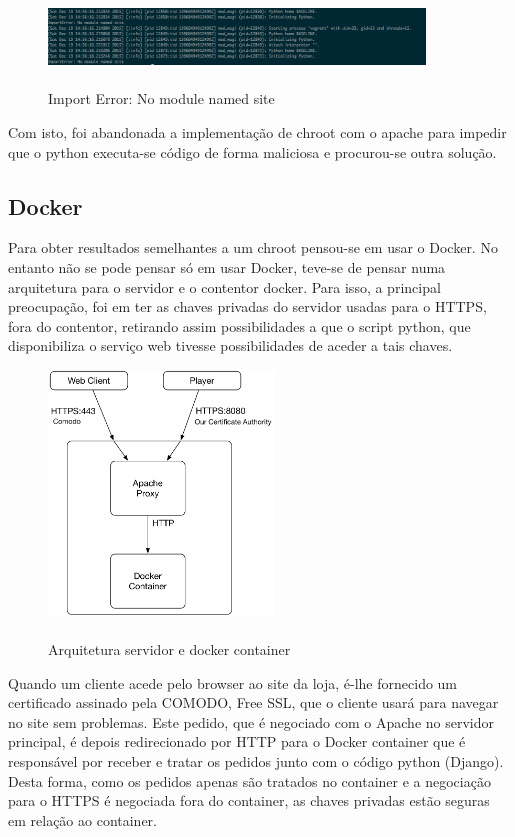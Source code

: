 \documentclass[pdftex,12pt,a4paper]{report}
\begin{document}
\begin{figure}[!htb]
\center
 \includegraphics[width=100mm,scale=1]{import_error.png}
 \caption{\\Import Error: No module named site}
 \label{fig:import_Error}
\end{figure}

Com isto, foi abandonada a implementação de chroot com o apache para impedir que o python executa-se código de forma maliciosa e procurou-se outra solução.

\newpage
\subsection{Docker}
Para obter resultados semelhantes a um chroot pensou-se em usar o Docker. No entanto não se pode pensar só em usar Docker, teve-se de pensar numa arquitetura para o servidor e o contentor docker. Para isso, a principal preocupação, foi em ter as chaves privadas do servidor usadas para o HTTPS, fora do contentor, retirando assim possibilidades a que o script python, que disponibiliza o serviço web tivesse possibilidades de aceder a tais chaves.

\begin{figure}[!htb]
\center
 \includegraphics[width=60mm,scale=1]{docker.pdf}
 \caption{\\Arquitetura servidor e docker container}
 \label{fig:docker_c}
\end{figure}

Quando um cliente acede pelo browser ao site da loja, é-lhe fornecido um certificado assinado pela COMODO, Free SSL, que o cliente usará para navegar no site sem problemas. Este pedido, que é negociado com o Apache no servidor principal, é depois redirecionado por HTTP para o Docker container que é responsável por receber e tratar os pedidos junto com o código python (Django). Desta forma, como os pedidos apenas são tratados no container e a negociação para o HTTPS é negociada fora do container, as chaves privadas estão seguras em relação ao container.
\end{document}
